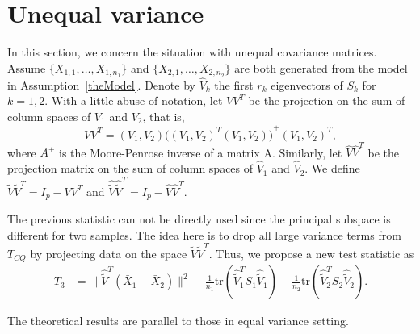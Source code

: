 \documentclass[review]{elsarticle}
\theoremstyle{plain}
\theoremstyle{definition}
\theoremstyle{remark}
\begin{document}
\section{Unequal variance}

In this section, we concern the situation with unequal covariance matrices.
Assume $\{X_{1,1},\ldots, X_{1,n_1}\}$ and $\{X_{2,1},\ldots, X_{2,n_2}\}$ are both generated from the model in Assumption~\ref{theModel}.
Denote by $\hat{V}_k$ the first $r_k$ eigenvectors of $S_k$ for $k=1,2$.
With a little abuse of notation, let $VV^T$ be the projection on the sum of column spaces of $V_1$ and $V_2$, that is,
\begin{equation*}
    VV^T =(V_1,V_2){\big({(V_1,V_2)}^T (V_1,V_2)\big)}^{+}{(V_1,V_2)}^T,
\end{equation*}
where $A^{+}$ is the Moore-Penrose inverse of a matrix A. Similarly, let $\hat{V}\hat{V}^T$ be the projection matrix on the sum of column spaces of $\hat{V}_1$ and $\hat{V}_2$.
 We define $\tilde{V}\tilde{V}^T=I_{p}-VV^T$ and $\hat{\tilde{V}}\hat{\tilde{V}}^T=I_{p}-\hat{V}\hat{V}^T$. 

The previous statistic can not be directly used since the principal subspace is different for two samples.
The idea here is to drop all large variance terms from $T_{CQ}$ by projecting data on the space $\tilde{V}\tilde{V}^T$. Thus, we propose a new test statistic as
\begin{equation*}
\begin{aligned}
    T_3&=\|\hat{\tilde{V}}^T(\bar{X}_1-\bar{X}_2)\|^2-\frac{1}{n_1}\mathrm{tr}(\hat{\tilde{V}}_1^T S_1\hat{\tilde{V}}_1)-\frac{1}{n_2}\mathrm{tr}(\hat{\tilde{V}}_2^T S_2\hat{\tilde{V}}_2).
\end{aligned}
\end{equation*}


The theoretical results are parallel to those in equal variance setting.

\end{document}
